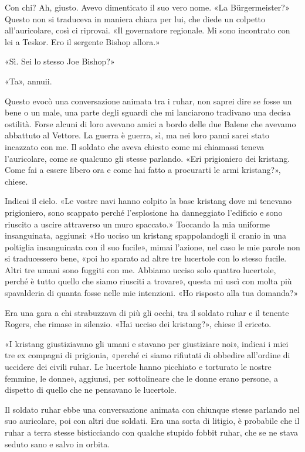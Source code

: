 Con chi? Ah, giusto. Avevo dimenticato il suo vero nome. «La
Bürgermeister?» Questo non si traduceva in maniera chiara per lui, che
diede un colpetto all'auricolare, così ci riprovai. «Il governatore
regionale. Mi sono incontrato con lei a Teskor. Ero il sergente Bishop
allora.»

«Sì. Sei lo stesso Joe Bishop?»

«Ta», annuii.

Questo evocò una conversazione animata tra i ruhar, non saprei dire se
fosse un bene o un male, una parte degli sguardi che mi lanciarono
tradivano una decisa ostilità. Forse alcuni di loro avevano amici a
bordo delle due Balene che avevamo abbattuto al Vettore. La guerra è
guerra, sì, ma nei loro panni sarei stato incazzato con me. Il soldato
che aveva chiesto come mi chiamassi teneva l'auricolare, come se
qualcuno gli stesse parlando. «Eri prigioniero dei kristang. Come fai a
essere libero ora e come hai fatto a procurarti le armi kristang?»,
chiese.

Indicai il cielo. «Le vostre navi hanno colpito la base kristang dove mi
tenevano prigioniero, sono scappato perché l'esplosione ha danneggiato
l'edificio e sono riuscito a uscire attraverso un muro spaccato.»
Toccando la mia uniforme insanguinata, aggiunsi: «Ho ucciso un kristang
spappolandogli il cranio in una poltiglia insanguinata con il suo
fucile», mimai l'azione, nel caso le mie parole non si traducessero
bene, «poi ho sparato ad altre tre lucertole con lo stesso fucile. Altri
tre umani sono fuggiti con me. Abbiamo ucciso solo quattro lucertole,
perché è tutto quello che siamo riusciti a trovare», questa mi uscì con
molta più spavalderia di quanta fosse nelle mie intenzioni. «Ho risposto
alla tua domanda?»

Era una gara a chi strabuzzava di più gli occhi, tra il soldato ruhar e
il tenente Rogers, che rimase in silenzio. «Hai ucciso dei kristang?»,
chiese il criceto.

«I kristang giustiziavano gli umani e stavano per giustiziare noi»,
indicai i miei tre ex compagni di prigionia, «perché ci siamo rifiutati
di obbedire all'ordine di uccidere dei civili ruhar. Le lucertole hanno
picchiato e torturato le nostre femmine, le donne», aggiunsi, per
sottolineare che le donne erano persone, a dispetto di quello che ne
pensavano le lucertole.

Il soldato ruhar ebbe una conversazione animata con chiunque stesse
parlando nel suo auricolare, poi con altri due soldati. Era una sorta di
litigio, è probabile che il ruhar a terra stesse bisticciando con
qualche stupido fobbit ruhar, che se ne stava seduto sano e salvo in
orbita.


